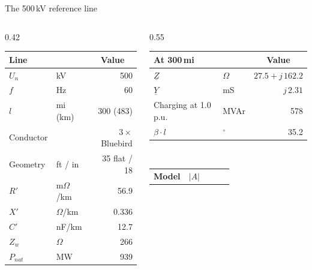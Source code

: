 \begin{frame}{The 500\,kV reference line}
  \vspace{0.5em}
  \begin{columns}[T,onlytextwidth]
    \begin{column}{0.42\textwidth}
      \renewcommand{\arraystretch}{1.05}
      {\footnotesize
      \begin{tabular}{@{}l l r@{}}
        \textbf{Line} & & \multicolumn{1}{c}{\textbf{Value}} \\
        \hline
        $U_n$        & kV            &                500 \\
        $f$          & Hz            &                 60 \\
        $l$          & mi (km)       &          300 (483) \\
        Conductor    &               & $3\times$ Bluebird \\
        Geometry     & ft / in       &    35 flat / 18 \\
        \hline
        $R'$         & m$\Omega$/km  &               56.9 \\
        $X'$         & $\Omega$/km   &              0.336 \\
        $C'$         & nF/km         &               12.7 \\
        \hline
        $Z_w$        & $\Omega$      &                266 \\
        $P_{nat}$    & MW            &                939 \\
        \hline
      \end{tabular}}
    \end{column}
    \begin{column}{0.55\textwidth}
      \renewcommand{\arraystretch}{1.05}
      {\footnotesize
      \begin{tabular}{@{}l l r@{}}
        \textbf{At 300\,mi} & & \multicolumn{1}{c}{\textbf{Value}} \\
        \hline
        $\underline{Z}$     & $\Omega$ & $27.5+j\,162.2$ \\
        $\underline{Y}$     & mS       & $j\,2.31$ \\
        Charging at 1.0\,p.u. & MVAr   & 578 \\
        $\beta\cdot l$      & $^\circ$ & 35.2 \\
        \hline
      \end{tabular}}\\[0.8em]
      {\footnotesize
      \begin{tabular}{@{}l r r r r@{}}
        \textbf{Model} & \multicolumn{1}{c}{\textbf{$\left|A\right|$}}

\end{tabular}}
\end{column}
\end{columns}
\end{frame}

